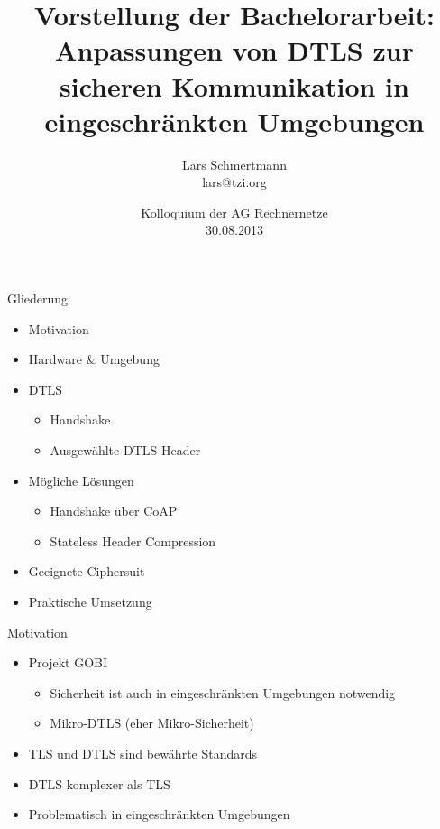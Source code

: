 \documentclass{beamer}
\title[Anpassungen von DTLS]%
{%
  Vorstellung der Bachelorarbeit: Anpassungen von DTLS zur sicheren Kommunikation in eingeschränkten Umgebungen
}
\author[Lars Schmertmann]%
{
{Lars Schmertmann}\\
\vspace{.2cm}
{\scriptsize lars@tzi.org}
}
\institute{TZI, Universit\"{a}t Bremen, Deutschland}
\date[08.2013]%
{{Kolloquium der AG Rechnernetze\\
30.08.2013}}%
\begin{document}

\begin{frame}
  \titlepage
\end{frame}

\begin{frame}{Gliederung}
  \begin{itemize}
    \item Motivation
    \item Hardware \& Umgebung
    \item DTLS
      \begin{itemize}
        \item Handshake
        \item Ausgewählte DTLS-Header
      \end{itemize}
    \item Mögliche Lösungen
    \begin{itemize}
      \item Handshake über CoAP
      \item Stateless Header Compression
    \end{itemize}
    \item Geeignete Ciphersuit
    \item Praktische Umsetzung
  \end{itemize}
\end{frame}

\begin{frame}{Motivation}
  \begin{itemize}
    \item Projekt GOBI
    \begin{itemize}
      \item Sicherheit ist auch in eingeschränkten \newline Umgebungen notwendig
      \item Mikro-DTLS (eher Mikro-Sicherheit)
    \end{itemize}
    \item TLS und DTLS sind bewährte Standards
    \item DTLS komplexer als TLS
    \item Problematisch in eingeschränkten Umgebungen
  \end{itemize}
\end{frame}
\end{document}
